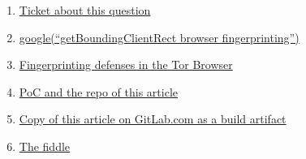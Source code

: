 \documentclass[letterpaper,14pt]{article}
\begin{document}
\begin{enumerate}
\itemsep1pt\parskip0pt
\item
  \href{https://trac.torproject.org/projects/tor/ticket/13400}{Ticket about this question}
\item
  \href{https://www.google.com/search?num=100\&newwindow=1\&q=getBoundingClientRect+browser+fingerprinting}{google(``getBoundingClientRect browser fingerprinting'')}
\item
  \href{https://www.torproject.org/projects/torbrowser/design/\#fingerprinting-defenses}{Fingerprinting defenses in the Tor Browser}
\item
  \href{https://gitlab.com/KOLANICH1/Article-2015-Dull-captaincy-or-the-way-Tor-Project-fights-browser-fingerprinting}{PoC and the repo of this article}
\item
  \href{https://gitlab.com/KOLANICH1/Article-2015-Dull-captaincy-or-the-way-Tor-Project-fights-browser-fingerprinting/-/jobs/artifacts/master/raw/readme.en.pdf?job=build}{Copy of this article on GitLab.com as a build artifact}
\item
  \href{https://jsfiddle.net/fyw4qmdg/5/}{The fiddle}
\end{enumerate}

\nocite{*}
\printbibliography[heading=bibnumbered]
\end{document}
